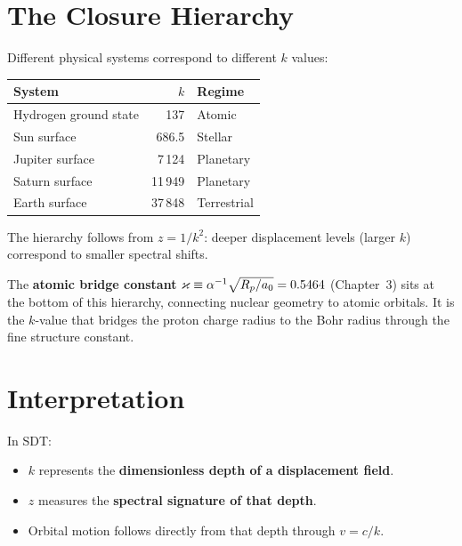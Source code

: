 \section{The Closure Hierarchy}
\label{sec:hierarchy}

Different physical systems correspond to different $k$ values:

\begin{center}
\begin{tabular}{lrl}
\toprule
\textbf{System} & $k$ & \textbf{Regime} \\
\midrule
Hydrogen ground state & 137 & Atomic \\
Sun surface & 686.5 & Stellar \\
Jupiter surface & 7\,124 & Planetary \\
Saturn surface & 11\,949 & Planetary \\
Earth surface & 37\,848 & Terrestrial \\
\bottomrule
\end{tabular}
\end{center}

The hierarchy follows from $z = 1/k^2$: deeper displacement levels (larger $k$) correspond to smaller spectral shifts.

The \textbf{atomic bridge constant} $\varkappa \equiv \alpha^{-1}\sqrt{R_p/a_0} = 0.5464$ (Chapter~3) sits at the bottom of this hierarchy, connecting nuclear geometry to atomic orbitals.  It is the $k$-value that bridges the proton charge radius to the Bohr radius through the fine structure constant.


\section{Interpretation}
\label{sec:interpretation}

In SDT:
\begin{itemize}
  \item $k$ represents the \textbf{dimensionless depth of a displacement field}.
  \item $z$ measures the \textbf{spectral signature of that depth}.
  \item Orbital motion follows directly from that depth through $v = c/k$.
\end{itemize}

